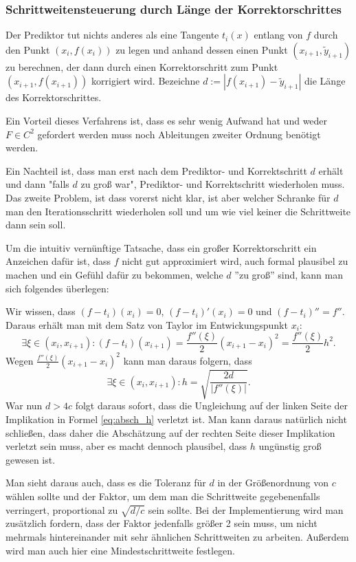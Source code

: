 \documentclass[a4paper,11pt,bibliography=totoc,listof=totoc,headinclude=true,cleardoublepage=empty,oneside]{scrartcl}
\begin{document}
\subsubsection{Schrittweitensteuerung durch Länge der Korrektorschrittes}\label{chap:5.1.3}
Der Prediktor tut nichts anderes als eine Tangente $t_i(x)$ entlang von $f$ durch den Punkt $(x_i,f(x_i))$ zu legen und anhand dessen einen Punkt $(x_{i+1},\tilde{y}_{i+1})$ zu berechnen, der dann durch einen Korrektorschritt zum Punkt $(x_{i+1},f(x_{i+1}))$ korrigiert wird. Bezeichne $d:= |f(x_{i+1})-\tilde{y}_{i+1}|$ die Länge des Korrektorschrittes. 

Ein Vorteil dieses Verfahrens ist, dass es sehr wenig Aufwand hat und weder $F \in C^2$ gefordert werden muss noch Ableitungen zweiter Ordnung benötigt werden. 

Ein Nachteil ist, dass man erst nach dem Prediktor- und Korrektschritt $d$ erhält und dann "falls $d$ zu groß war", Prediktor- und Korrektschritt wiederholen muss. Das zweite Problem, ist dass vorerst nicht klar, ist aber welcher Schranke für $d$ man den Iterationsschritt wiederholen soll und um wie viel keiner die Schrittweite dann sein soll.

Um die intuitiv vernünftige Tatsache, dass ein großer Korrektorschritt ein Anzeichen dafür ist, dass $f$ nicht gut approximiert wird, auch formal plausibel zu machen und ein Gefühl dafür zu bekommen, welche $d$ ''zu groß'' sind, kann man sich folgendes überlegen:

Wir wissen, dass $(f-t_i)(x_i)=0$, $(f-t_i)'(x_i)=0$ und $(f-t_i)''=f''$. Daraus erhält man mit dem Satz von Taylor im Entwickungspunkt $x_i$:
\[
\exists \xi \in (x_i,x_{i+1}) : (f-t_i)(x_{i+1}) = \frac{f''(\xi)}{2}(x_{i+1}-x_i)^2 = \frac{f''(\xi)}{2}h^2.
\]
Wegen $\frac{f''(\xi)}{2}(x_{i+1}-x_i)^2$ kann man daraus folgern, dass
\[
\exists \xi \in (x_i,x_{i+1}) : h = \sqrt{\frac{2d}{|f''(\xi)|}}.
\]
War nun $d > 4c$ folgt daraus sofort, dass die Ungleichung auf der linken Seite der Implikation in Formel \eqref{eq:absch_h} verletzt ist. Man kann daraus natürlich nicht schließen, dass daher die Abschätzung auf der rechten Seite dieser Implikation verletzt sein muss, aber es macht dennoch plausibel, dass $h$ ungünstig groß gewesen ist. 

Man sieht daraus auch, dass es die Toleranz für $d$ in der Größenordnung von $c$ wählen sollte und der Faktor, um dem man die Schrittweite gegebenenfalls verringert, proportional zu $\sqrt{d/c}$ sein sollte. Bei der Implementierung wird man zusätzlich fordern, dass der Faktor jedenfalls größer 2 sein muss, um nicht mehrmals hintereinander mit sehr ähnlichen Schrittweiten zu arbeiten. Außerdem wird man auch hier eine Mindestschrittweite festlegen.
\end{document}
